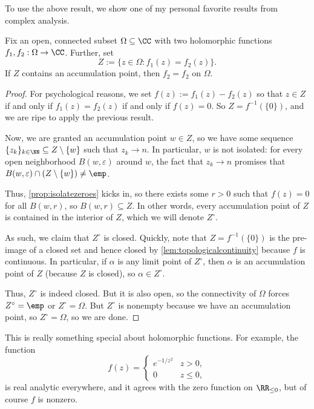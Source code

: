 To use the above result, we show one of my personal favorite results from complex analysis.
\begin{theorem}[Identity]
	Fix an open, connected subset $\Omega\subseteq\CC$ with two holomorphic functions $f_1,f_2:\Omega\to\CC$. Further, set
	\[Z:=\{z\in\Omega:f_1(z)=f_2(z)\}.\]
	If $Z$ contains an accumulation point, then $f_2=f_2$ on $\Omega$.
\end{theorem}
\begin{proof}
	For psychological reasons, we set $f(z):=f_1(z)-f_2(z)$ so that $z\in Z$ if and only if $f_1(z)=f_2(z)$ if and only if $f(z)=0$. So $Z=f^{-1}(\{0\})$, and we are ripe to apply the previous result.

	Now, we are granted an accumulation point $w\in Z$, so we have some sequence $\{z_k\}_{k\in\NN}\subseteq Z\setminus\{w\}$ such that $z_k\to n$. In particular, $w$ is not isolated: for every open neighborhood $B(w,\varepsilon)$ around $w$, the fact that $z_k\to n$ promises that $B(w,\varepsilon)\cap(Z\setminus\{w\})\ne\emp$.

	Thus, \autoref{prop:isolatezeroes} kicks in, so there exists some $r>0$ such that $f(z)=0$ for all $B(w,r)$, so $B(w,r)\subseteq Z$. In other words, every accumulation point of $Z$ is contained in the interior of $Z$, which we will denote $Z^\circ$.

	As such, we claim that $Z^\circ$ is closed. Quickly, note that $Z=f^{-1}(\{0\})$ is the pre-image of a closed set and hence closed by \autoref{lem:topologicalcontinuity} because $f$ is continuous.
	In particular, if $\alpha$ is any limit point of $Z^\circ$, then $\alpha$ is an accumulation point of $Z$ (because $Z$ is closed), so $\alpha\in Z^\circ$.

	Thus, $Z^\circ$ is indeed closed. But it is also open, so the connectivity of $\Omega$ forces $Z^\circ=\emp$ or $Z^\circ=\Omega$. But $Z^\circ$ is nonempty because we have an accumulation point, so $Z^\circ=\Omega$, so we are done.
\end{proof}
\begin{remark}
	This is really something special about holomorphic functions. For example, the function
	\[f(z)=\begin{cases}
		e^{-1/z^2} & z>0, \\
		0 & z\le0,
	\end{cases}\]
	is real analytic everywhere, and it agrees with the zero function on $\RR_{\le0}$, but of course $f$ is nonzero.
\end{remark}
